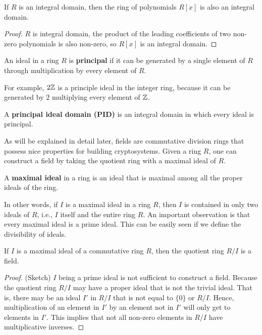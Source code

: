 \documentclass[../main.tex]{subfiles}
\begin{document}
\begin{proposition}
If $R$ is an integral domain, then the ring of polynomials $R[x]$ is also an integral domain.
\end{proposition}
\begin{proof}
$R$ is integral domain, the product of the leading coefficients of two non-zero polynomials is also non-zero, so $R[x]$ is an integral domain. 
\end{proof}



\begin{definition}
An ideal in a ring $R$ is \textbf{principal} \reversemarginpar
{}
if it can be generated by a single element of $R$ through multiplication by every element of $R$.  
\end{definition}
For example, $2\mathbb{Z}$ is a principle ideal in the integer ring, because it can be generated by $2$ multiplying every element of $\mathbb{Z}$. 

\begin{definition}
A \textbf{principal ideal domain (PID)} is an integral domain in which every ideal is principal. 
\end{definition}

As will be explained in detail later, fields are commutative division rings that possess nice properties for building cryptosystems. Given a ring $R$, one can construct a field by taking the quotient ring with a maximal ideal of $R$. 
\begin{definition}
A \textbf{maximal ideal}\reversemarginpar
{}
 in a ring is an ideal that is maximal among all the proper ideals of the ring. 
\end{definition}
In other words, if $I$ is a maximal ideal in a ring $R$, then $I$ is contained in only two ideals of $R$, i.e., $I$ itself and the entire ring $R$. 
An important observation is that every maximal ideal is a prime ideal. This can be easily seen if we define the divisibility of ideals.

\begin{proposition}
\label{prop:quotRngIsField}
If $I$ is a maximal ideal of a commutative ring $R$, then the quotient ring $R/I$ is a field. 
\end{proposition}
\begin{proof}
(Sketch) $I$ being a prime ideal is not sufficient to construct a field. Because the quotient ring $R/I$ may have a proper ideal that is not the trivial ideal. That is, there may be an ideal $I'$ in $R/I$ that is not equal to $\{0\}$ or $R/I$. Hence, multiplication of an element in $I'$ by an element not in $I'$ will only get to elements in $I'$. This implies that not all non-zero elements in $R/I$ have multiplicative inverses. 
\end{proof}
\end{document}
